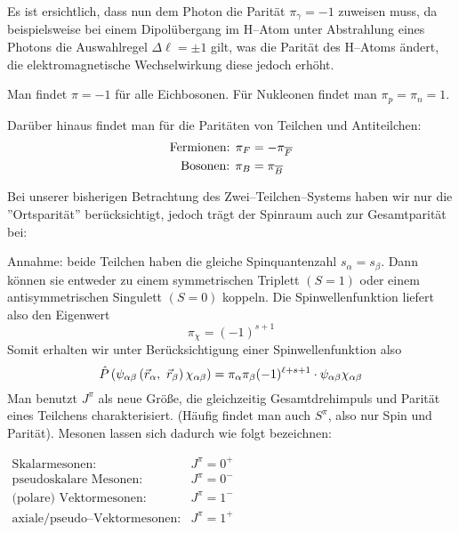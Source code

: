 \documentclass[Ex4_Zusammenfassung.tex]{subfiles}
\begin{document}
Es ist ersichtlich, dass nun dem Photon die Parität $\pi_\gamma = -1$ zuweisen muss, da beispielsweise bei einem Dipolübergang im H--Atom unter Abstrahlung eines Photons die Auswahlregel $\Delta \ell = \pm 1$ gilt, was die Parität des H--Atoms ändert, die elektromagnetische Wechselwirkung diese jedoch erhöht.

Man findet $\pi = -1$ für alle Eichbosonen. Für Nukleonen findet man $\pi_p = \pi_n = 1$. 

Darüber hinaus findet man für die Paritäten von Teilchen und Antiteilchen:
\begin{align*}
	\text{Fermionen: } \pi_F &= -\pi_{\overline{F}}\\
	\text{Bosonen: } \pi_B &= \pi_{\overline{B}}
\end{align*}

Bei unserer bisherigen Betrachtung des Zwei--Teilchen--Systems haben wir nur die ''Ortsparität'' berücksichtigt, jedoch trägt der Spinraum auch zur Gesamtparität bei: 

Annahme: beide Teilchen haben die gleiche Spinquantenzahl $s_\alpha = s_\beta$. Dann können sie entweder zu einem symmetrischen Triplett $(S=1)$ oder einem antisymmetrischen Singulett $(S=0)$ koppeln. Die Spinwellenfunktion liefert also den Eigenwert 
\begin{equation}
	\pi_\chi = (-1)^{s+1}
\end{equation}
Somit erhalten wir unter Berücksichtigung einer Spinwellenfunktion also
\begin{equation}
	\hat{P} \left( \psi_{\alpha \beta} \left( \vec{r}_\alpha ,\ \vec{r}_\beta \right) \chi_{\alpha \beta} \right) = \pi_\alpha \pi_\beta (-1)^{\ell + s + 1} \cdot \psi_{\alpha \beta} \chi_{\alpha \beta}
\end{equation}
Man benutzt $J^\pi$ als neue Größe, die gleichzeitig Gesamtdrehimpuls und Parität eines Teilchens charakterisiert. (Häufig findet man auch $S^\pi$, also nur Spin und Parität). Mesonen lassen sich dadurch wie folgt bezeichnen:
\begin{table}[H]
	\centering
	$
	\begin{array}{rl}
	\text{Skalarmesonen:} & J^\pi = 0^+ \\ 
	\text{pseudoskalare Mesonen:} & J^\pi = 0^- \\ 
	\text{(polare) Vektormesonen:} & J^\pi = 1^- \\ 
	\text{axiale/pseudo--Vektormesonen:}  & J^\pi = 1^+
	\end{array} 
	$
\end{table}
\end{document}
